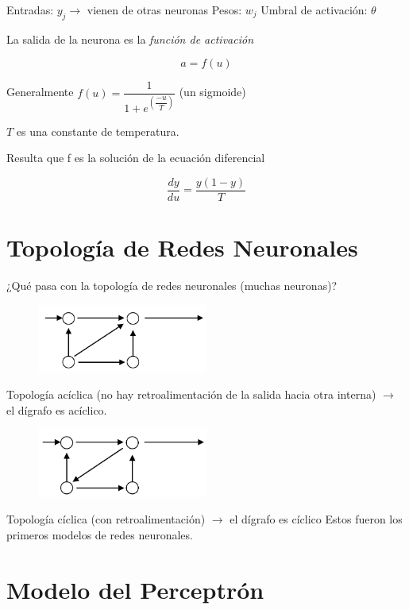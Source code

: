 Entradas: $ y_j \rightarrow $  vienen de otras neuronas
Pesos: $w_j$
Umbral de activación: $ \theta $

La salida de la neurona es la \textit{función de activación}

$$
a=f(u)
$$

Generalmente $ f(u) = \dfrac{1}{1 + e^(\dfrac{-u}{T})}$ (un sigmoide)

$T$ es una constante de temperatura. 


Resulta que f es la solución de la ecuación diferencial 

$$
\dfrac{dy}{du} = \dfrac{y(1-y)}{T}
$$


\section{Topología de Redes Neuronales}

¿Qué pasa con la topología de redes neuronales (muchas neuronas)?

\begin{figure}[h!]
	\centering
	\includegraphics[width=0.5\textwidth]{images/img74.png}
	\label{figura74}
\end{figure}
\break

Topología acíclica (no hay retroalimentación de la salida hacia otra interna) $\rightarrow$ el dígrafo es acíclico.

\begin{figure}[h!]
	\centering
	\includegraphics[width=0.5\textwidth]{images/img75.png}
	\label{figura75}
\end{figure}


Topología cíclica (con retroalimentación) $\rightarrow$ el dígrafo es cíclico
Estos fueron los primeros modelos de redes neuronales.

\section{Modelo del Perceptrón}

